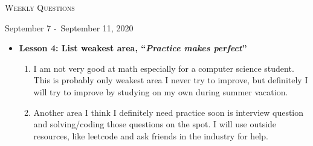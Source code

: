\centerline{\LARGE\textsc{Weekly Questions}}
\centerline{September 7 -\ September 11, 2020}
\textbf{}
\begin{itemize}
  \item[] \textbf{\large Lesson 4: List weakest area, ``\emph{Practice makes perfect}''}
  \begin{enumerate}
    \item I am not very good at math especially for a computer science student.
    This is probably only weakest area I never try to improve, but definitely I
    will try to improve by studying on my own during summer vacation.
    \item Another area I think I definitely need practice soon is interview question
    and solving/coding those questions on the spot. I will use outside resources, like
    leetcode and ask friends in the industry for help.
  \end{enumerate}
\end{itemize}